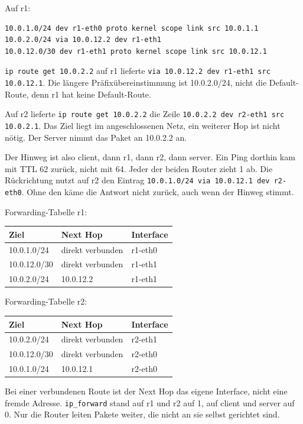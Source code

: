 \documentclass[a4paper,11pt]{article}
\begin{document}
Auf r1:
\begin{lstlisting}
10.0.1.0/24 dev r1-eth0 proto kernel scope link src 10.0.1.1
10.0.2.0/24 via 10.0.12.2 dev r1-eth1
10.0.12.0/30 dev r1-eth1 proto kernel scope link src 10.0.12.1
\end{lstlisting}
\texttt{ip route get 10.0.2.2} auf r1 lieferte \texttt{via 10.0.12.2 dev r1-eth1 src 10.0.12.1}. Die längere Präfixübereinstimmung ist 10.0.2.0/24, nicht die Default-Route, denn r1 hat keine Default-Route.

Auf r2 lieferte \texttt{ip route get 10.0.2.2} die Zeile \texttt{10.0.2.2 dev r2-eth1 src 10.0.2.1}. Das Ziel liegt im angeschlossenen Netz, ein weiterer Hop ist nicht nötig. Der Server nimmt das Paket an 10.0.2.2 an.

Der Hinweg ist also client, dann r1, dann r2, dann server. Ein Ping dorthin kam mit TTL 62 zurück, nicht mit 64. Jeder der beiden Router zieht 1 ab. Die Rückrichtung nutzt auf r2 den Eintrag \texttt{10.0.1.0/24 via 10.0.12.1 dev r2-eth0}. Ohne den käme die Antwort nicht zurück, auch wenn der Hinweg stimmt.

Forwarding-Tabelle r1:
\begin{center}
\begin{tabular}{@{}lll@{}}
\toprule
Ziel & Next Hop & Interface \\
\midrule
10.0.1.0/24 & direkt verbunden & r1-eth0 \\
10.0.12.0/30 & direkt verbunden & r1-eth1 \\
10.0.2.0/24 & 10.0.12.2 & r1-eth1 \\
\bottomrule
\end{tabular}
\end{center}
Forwarding-Tabelle r2:
\begin{center}
\begin{tabular}{@{}lll@{}}
\toprule
Ziel & Next Hop & Interface \\
\midrule
10.0.2.0/24 & direkt verbunden & r2-eth1 \\
10.0.12.0/30 & direkt verbunden & r2-eth0 \\
10.0.1.0/24 & 10.0.12.1 & r2-eth0 \\
\bottomrule
\end{tabular}
\end{center}
Bei einer verbundenen Route ist der Next Hop das eigene Interface, nicht eine fremde Adresse. \texttt{ip\_forward} stand auf r1 und r2 auf 1, auf client und server auf 0. Nur die Router leiten Pakete weiter, die nicht an sie selbst gerichtet sind.
\end{document}
